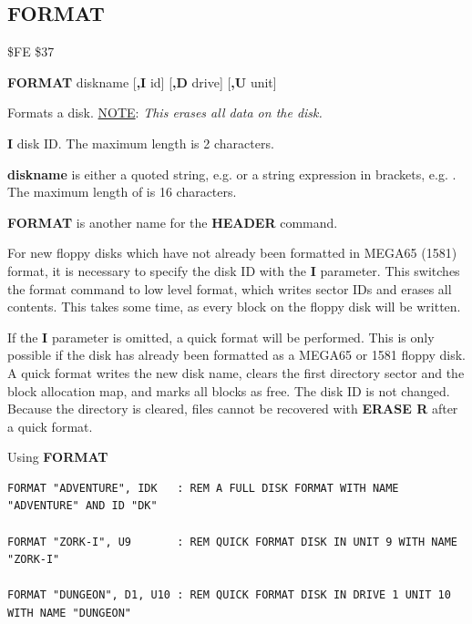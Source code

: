 \subsection{FORMAT}
\begin{description}[leftmargin=2cm,style=nextline]
\item [Token:]    \$FE \$37

\item [Format:]   {\bf FORMAT} diskname [{\bf,I} id] [{\bf,D} drive] [{\bf,U} unit]

\item [Usage:]    Formats a disk. \underline{NOTE}: {\em This erases all data on the disk.}

                  {\bf I} disk ID. The maximum length is 2 characters.

                  {\bf diskname} is either a quoted string, e.g.  or a string expression in brackets, e.g. . The maximum length of is 16 characters.

                  \drivedefinition

                  \unitdefinition

\item [Remarks:]  {\bf FORMAT} is another name for the {\bf HEADER} command.

                  For new floppy disks which have not already been formatted in MEGA65 (1581) format, it is necessary to specify the disk ID with the {\bf I} parameter. This switches the format command to low level format, which writes sector IDs and erases all contents. This takes some time, as every block on the floppy disk will be written.

                  If the {\bf I} parameter is omitted, a quick format will be performed. This is only possible if the disk has already been formatted as a MEGA65 or 1581 floppy disk. A quick format writes the new disk name, clears the first directory sector and the block allocation map, and marks all blocks as free. The disk ID is not changed. Because the directory is cleared, files cannot be recovered with {\bf ERASE R} after a quick format.

\item [Examples:] Using {\bf FORMAT}

\begin{tcolorbox}[colback=black,coltext=white]
\verbatimfont{\codefont}
\begin{verbatim}
FORMAT "ADVENTURE", IDK   : REM A FULL DISK FORMAT WITH NAME "ADVENTURE" AND ID "DK"

FORMAT "ZORK-I", U9       : REM QUICK FORMAT DISK IN UNIT 9 WITH NAME "ZORK-I"

FORMAT "DUNGEON", D1, U10 : REM QUICK FORMAT DISK IN DRIVE 1 UNIT 10 WITH NAME "DUNGEON"
\end{verbatim}
\end{tcolorbox}
\end{description}


